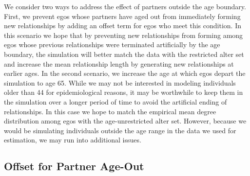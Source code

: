 \documentclass [11pt, proquest] {uwthesis}[2015/03/03]
\begin{document}
We consider two ways to address the effect of partners outside the age boundary. First, we prevent egos whose partners have aged out from immediately forming new relationships by adding an offset term for egos who meet this condition. In this scenario we hope that by preventing new relationships from forming among egos whose previous relationships were terminated artificially by the age boundary, the simulation will better match the data with the restricted alter set and increase the mean relationship length by generating new relationships at earlier ages. In the second scenario, we increase the age at which egos depart the simulation to age 65. While we may not be interested in modeling individuals older than 44 for epidemiological reasons, it may be worthwhile to keep them in the simulation over a longer period of time to avoid the artificial ending of relationships. In this case we hope to match the empirical mean degree distribution among egos with the age-unrestricted alter set. However, because we would be simulating individuals outside the age range in the data we used for estimation, we may run into additional issues.

\hypertarget{offset-for-partner-age-out}{%
\subsection{Offset for Partner Age-Out}\label{offset-for-partner-age-out}}
\end{document}
